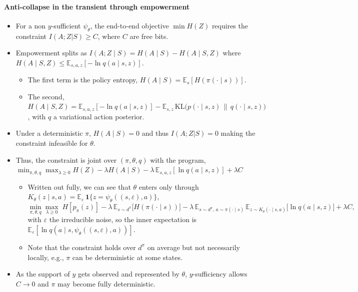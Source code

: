 \documentclass[10pt]{article}
\begin{document}
\paragraph{Anti-collapse in the transient through empowerment}
\begin{itemize}
  \item For a non $y$-sufficient $\psi_\theta$, the end-to-end objective $\min H(Z)$ requires the constraint $I(A;Z|S) \ge C$, where $C$ are free bits.
  \item Empowerment splits as $I(A;Z \mid S) = H(A \mid S) - H(A \mid S,Z)$ where $H(A \mid S, Z) \le \mathbb E_{s,a,z}[-\ln q(a \mid s,z)]$.
  \begin{itemize}
    \item The first term is the policy entropy, $H(A \mid S) = \mathbb E_{s}[H(\pi(\cdot \mid s))]$.
    \item The second, $H(A \mid S,Z) = \mathbb E_{s,a,z}[-\ln q(a \mid s,z)] - \mathbb E_{s,z}\,\mathrm{KL}\big(p(\cdot \mid s,z) \,\|\, q(\cdot \mid s,z)\big)$, with $q$ a variational action posterior.
  \end{itemize}
  \item Under a deterministic $\pi$, $H(A \mid S) = 0$ and thus $I(A;Z|S) = 0$ making the constraint infeasible for $\theta$.
  \item Thus, the constraint is joint over $(\pi,\theta, q)$ with the program, $\min_{\pi,\theta, q} \max_{\lambda \ge 0} H(Z) - \lambda H(A \mid S) - \lambda\,\mathbb E_{s,a,z}[\ln q(a \mid s,z)] + \lambda C$
  \begin{itemize}
    \item Written out fully, we can see that $\theta$ enters only through $K_\theta(z \mid s,a) = \mathbb E_\varepsilon\,\mathbf 1\{z = \psi_\theta((s,\varepsilon),a)\}$,
    \[
      \min_{\pi,\theta,q} \max_{\lambda \ge 0}\; H[p_\pi(z)] - \lambda\,\mathbb E_{s \sim d^\pi}\big[H(\pi(\cdot \mid s))\big] - \lambda\,\mathbb E_{s \sim d^\pi,\, a \sim \pi(\cdot \mid s)}\,\mathbb E_{z \sim K_\theta(\cdot \mid s,a)}\big[\ln q(a \mid s,z)\big] + \lambda C,
    \]
    with $\varepsilon$ the irreducible noise, so the inner expectation is $\mathbb E_\varepsilon[\ln q(a \mid s,\psi_\theta((s,\varepsilon),a))]$.
    \item Note that the constraint holds over $d^\pi$ on average but not necessarily locally, e.g., $\pi$ can be deterministic at some states.
  \end{itemize}
  \item As the support of $y$ gets observed and represented by $\theta$, $y$-sufficiency allows $C \to 0$ and $\pi$ may become fully deterministic.
\end{itemize}
\end{document}
